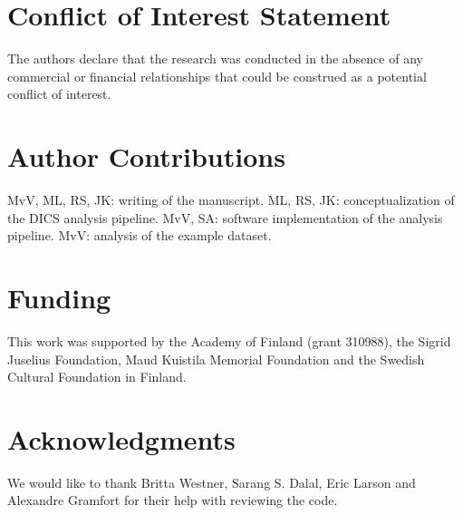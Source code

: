 \documentclass[utf8]{frontiersSCNS}
\begin{document}
\section*{Conflict of Interest Statement}

The authors declare that the research was conducted in the absence of any commercial or financial relationships that could be construed as a potential conflict of interest.


\section*{Author Contributions}

MvV, ML, RS, JK: writing of the manuscript.
ML, RS, JK: conceptualization of the DICS analysis pipeline. 
MvV, SA: software implementation of the analysis pipeline.
MvV: analysis of the example dataset.


\section*{Funding}

This work was supported by the Academy of Finland (grant 310988), the Sigrid Juselius Foundation, Maud Kuistila Memorial Foundation and the Swedish Cultural Foundation in Finland.


\section*{Acknowledgments}

We would like to thank Britta Westner, Sarang S. Dalal, Eric Larson and Alexandre Gramfort for their help with reviewing the code.




\end{document}
